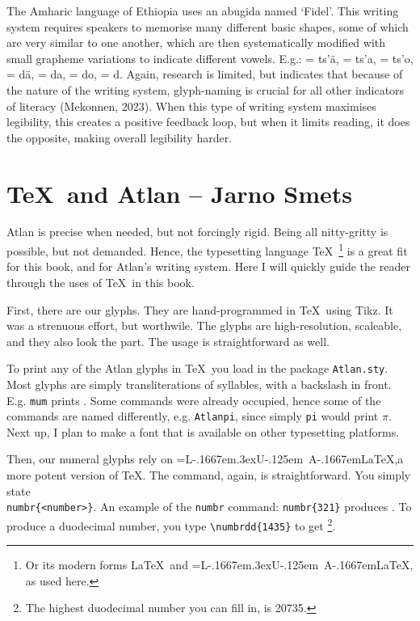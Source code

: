 The Amharic language of Ethiopia uses an abugida named ‘Fidel’. This writing system requires speakers to memorise many different basic shapes, some of which are very similar to one another, which are then systematically modified with small grapheme variations to indicate different vowels. E.g.:  = ts’\"{a},  = ts’a,  = ts’o,  = d\"{a},  = da,  = do,  = d. Again, research is limited, but indicates that because of the nature of the writing system, glyph-naming is crucial for all other indicators of literacy (Mekonnen, 2023). When this type of writing system maximises legibility, this creates a positive feedback loop, but when it limits reading, it does the opposite, making overall legibility harder.  

\vfill
\def\Lua{\setbox2=\hbox{L\kern-.1667em\lower.3ex\hbox{U}\kern-.125em A}\box2}
\def\LuaLaTeX{{\fontfamily{cmr}\selectfont \Lua\kern-.1667em\LaTeX}}
\section{\TeX{}\ and Atlan -- {\small Jarno Smets}}
Atlan is precise when needed, but not forcingly rigid. Being all nitty-gritty is possible, but not demanded. Hence, the typesetting language \TeX{}\ \footnote{Or its modern forms \LaTeX\ and \LuaLaTeX, as used here.} is a great fit for this book, and for Atlan's writing system. Here I will quickly guide the reader through the uses of \TeX{}\ in this book.

First, there are our glyphs. They are hand-programmed in \TeX{}\ using Tikz. It was a strenuous effort, but worthwile. The glyphs are high-resolution, scaleable, and they also look the part. The usage is straightforward as well. 

To print any of the Atlan glyphs in \TeX{}\, you load in the package {\tt Atlan.sty}. Most glyphs are simply transliterations of syllables, with a backslash in front. E.g. \texttt{mum} prints \mum. Some commands were already occupied, hence some of the commands are named differently, e.g. \texttt{Atlanpi}, since simply \texttt{pi} would print $\pi$. Next up, I plan to make a font that is available on other typesetting platforms. 

Then, our numeral glyphs rely on \LuaLaTeX ,a more potent version of \TeX{}. The command, again, is straightforward. You simply state \texttt{\\numbr\{<number>\footnotemark\}}.   An example of the {\tt numbr} command: \texttt{numbr\{321\}} produces . To produce a duodecimal number, you type \verb|\numbrdd{1435}| to get \footnote{The highest duodecimal number you can fill in, is 20735.}. 



